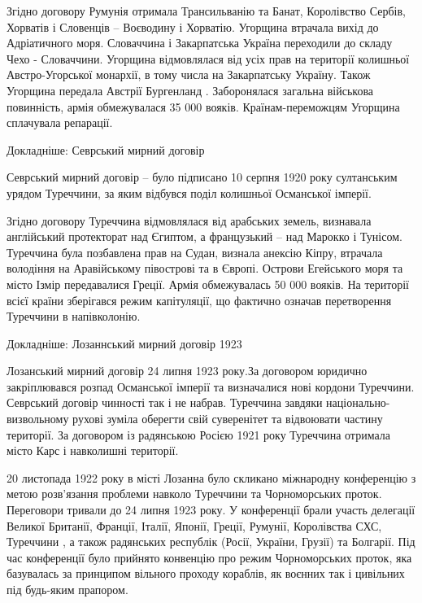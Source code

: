 \begin{itemize}
\begin{itemize}
\begin{multicols}{2}
Згідно договору Румунія отримала Трансильванію та Банат, Королівство Сербів,
Хорватів і Словенців – Воєводину і Хорватію. Угорщина втрачала вихід до
Адріатичного моря. Словаччина і Закарпатська Україна переходили до складу Чехо
- Словаччини. Угорщина відмовлялася від усіх прав на території колишньої
Австро-Угорської монархії, в тому числа на Закарпатську Україну. Також Угорщина
передала Австрії Бургенланд . Заборонялася загальна військова повинність, армія
обмежувалася 35 000 вояків. Країнам-переможцям Угорщина сплачувала репарації.


Докладніше: Севрський мирний договір

Севрський мирний договір – було підписано 10 серпня 1920 року султанським
урядом Туреччини, за яким відбувся поділ колишньої Османської імперії.

Згідно договору Туреччина відмовлялася від арабських земель, визнавала
англійський протекторат над Єгиптом, а французький – над Марокко і Тунісом.
Туреччина була позбавлена прав на Судан, визнала анексію Кіпру, втрачала
володіння на Аравійському півострові та в Європі. Острови Егейського моря та
місто Ізмір передавалися Греції. Армія обмежувалась 50 000 вояків. На території
всієї країни зберігався режим капітуляції, що фактично означав перетворення
Туреччини в напівколонію.


Докладніше: Лозаннський мирний договір 1923

Лозанський мирний договір 24 липня 1923 року.За договором юридично
закріплювався розпад Османської імперії та визначалися нові кордони Туреччини.
Севрський договір чинності так і не набрав. Туреччина завдяки
національно-визвольному рухові зуміла оберегти свій суверенітет та відвоювати
частину території. За договором із радянською Росією 1921 року Туреччина
отримала місто Карс і навколишні території.

20 листопада 1922 року в місті Лозанна було скликано міжнародну конференцію з
метою розв’язання проблеми навколо Туреччини та Чорноморських проток.
Переговори тривали до 24 липня 1923 року. У конференції брали участь делегації
Великої Британії, Франції, Італії, Японії, Греції, Румунії, Королівства СХС,
Туреччини , а також радянських республік (Росії, України, Грузії) та Болгарії.
Під час конференції було прийнято конвенцію про режим Чорноморських проток, яка
базувалась за принципом вільного проходу кораблів, як воєнних так і цивільних
під будь-яким прапором.


\end{multicols}
\end{itemize}
\end{itemize}
